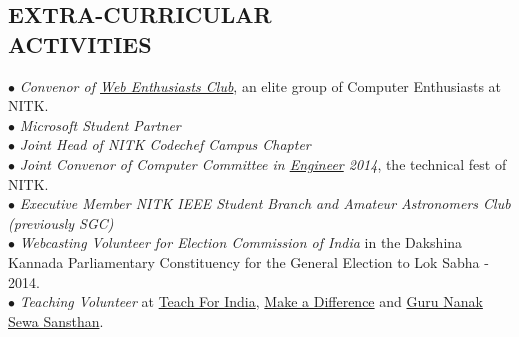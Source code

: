 \documentclass[margin,line]{resume}
\begin{document}
\begin{resume}
         
    \section{\mysidestyle \bf EXTRA-CURRICULAR \\ ACTIVITIES}             
 $\bullet$ {\it Convenor of \href{https://webclub-nitk.github.io/}{Web Enthusiasts Club}}, an elite group of Computer Enthusiasts at NITK. \\
 $\bullet$ {\it Microsoft Student Partner} \\
  $\bullet$ {\it Joint Head of NITK Codechef Campus Chapter}  \\
     $\bullet$ {\it Joint Convenor of Computer Committee in \href{http://www.nitk.ac.in/students-activities/engineer}{Engineer} 2014}, the technical fest of NITK. \\
     $\bullet$ {\it Executive Member NITK IEEE Student Branch and Amateur Astronomers Club (previously SGC)} \\
 $\bullet$ {\it Webcasting Volunteer for Election Commission of India} in the Dakshina Kannada Parliamentary Constituency for the General Election to Lok Sabha - 2014. \\ 
$\bullet$ {\it Teaching Volunteer} at \href{http://www.teachforindia.org/}{Teach For India}, \href{http://makeadiff.in/}{Make a Difference} and \href{https://www.nanakg.org/}{Guru Nanak Sewa Sansthan}. \\ 


\end{resume}
\end{document}
